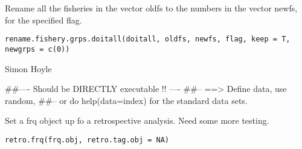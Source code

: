 \documentclass[a4paper]{book}
\begin{document}
%
\begin{Description}\relax

Rename all the fisheries in the vector oldfs to the numbers in the vector newfs, for the specified flag. 
\end{Description}
%
\begin{Usage}
\begin{verbatim}
rename.fishery.grps.doitall(doitall, oldfs, newfs, flag, keep = T, newgrps = c(0))
\end{verbatim}
\end{Usage}
%
\begin{Arguments}
\begin{ldescription}
\item[\code{doitall}] 


\item[\code{oldfs}] 


\item[\code{newfs}] 


\item[\code{flag}] 


\item[\code{keep}] 


\item[\code{newgrps}] 


\end{ldescription}
\end{Arguments}
%
\begin{Author}\relax

Simon Hoyle
\end{Author}
%
\begin{Examples}
\begin{ExampleCode}
##---- Should be DIRECTLY executable !! ----
##-- ==>  Define data, use random,
##--	or do  help(data=index)  for the standard data sets.

\end{ExampleCode}
\end{Examples}
%
\begin{Description}\relax

Set a frq object up fo a retrospective analysis. Need some more testing. 
\end{Description}
%
\begin{Usage}
\begin{verbatim}
retro.frq(frq.obj, retro.tag.obj = NA)
\end{verbatim}
\end{Usage}
\end{document}
